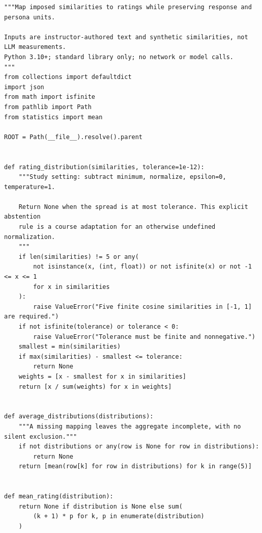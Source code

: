 \begin{Verbatim}[breaklines,breakanywhere,fontsize=\small]
"""Map imposed similarities to ratings while preserving response and persona units.

Inputs are instructor-authored text and synthetic similarities, not LLM measurements.
Python 3.10+; standard library only; no network or model calls.
"""
from collections import defaultdict
import json
from math import isfinite
from pathlib import Path
from statistics import mean

ROOT = Path(__file__).resolve().parent


def rating_distribution(similarities, tolerance=1e-12):
    """Study setting: subtract minimum, normalize, epsilon=0, temperature=1.

    Return None when the spread is at most tolerance. This explicit abstention
    rule is a course adaptation for an otherwise undefined normalization.
    """
    if len(similarities) != 5 or any(
        not isinstance(x, (int, float)) or not isfinite(x) or not -1 <= x <= 1
        for x in similarities
    ):
        raise ValueError("Five finite cosine similarities in [-1, 1] are required.")
    if not isfinite(tolerance) or tolerance < 0:
        raise ValueError("Tolerance must be finite and nonnegative.")
    smallest = min(similarities)
    if max(similarities) - smallest <= tolerance:
        return None
    weights = [x - smallest for x in similarities]
    return [x / sum(weights) for x in weights]


def average_distributions(distributions):
    """A missing mapping leaves the aggregate incomplete, with no silent exclusion."""
    if not distributions or any(row is None for row in distributions):
        return None
    return [mean(row[k] for row in distributions) for k in range(5)]


def mean_rating(distribution):
    return None if distribution is None else sum(
        (k + 1) * p for k, p in enumerate(distribution)
    )



\end{Verbatim}
